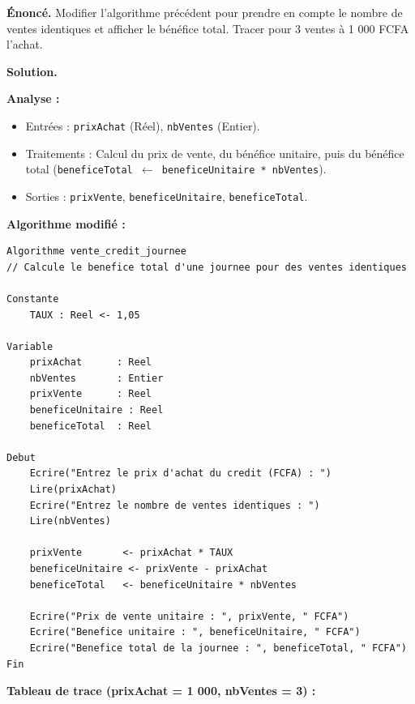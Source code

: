 \documentclass[11pt]{article}
\begin{document}
\begin{corrige}
\textbf{Énoncé.} Modifier l'algorithme précédent pour prendre en compte le nombre de ventes identiques et afficher le bénéfice total. Tracer pour 3 ventes à 1 000 FCFA l'achat.

\textbf{Solution.}

\textbf{Analyse :}
\begin{itemize}
\item Entrées : \texttt{prixAchat} (Réel), \texttt{nbVentes} (Entier).
\item Traitements : Calcul du prix de vente, du bénéfice unitaire, puis du bénéfice total (\texttt{beneficeTotal $\leftarrow$ beneficeUnitaire * nbVentes}).
\item Sorties : \texttt{prixVente}, \texttt{beneficeUnitaire}, \texttt{beneficeTotal}.
\end{itemize}

\textbf{Algorithme modifié :}

\begin{lstlisting}
Algorithme vente_credit_journee
// Calcule le benefice total d'une journee pour des ventes identiques

Constante
    TAUX : Reel <- 1,05

Variable
    prixAchat      : Reel
    nbVentes       : Entier
    prixVente      : Reel
    beneficeUnitaire : Reel
    beneficeTotal  : Reel

Debut
    Ecrire("Entrez le prix d'achat du credit (FCFA) : ")
    Lire(prixAchat)
    Ecrire("Entrez le nombre de ventes identiques : ")
    Lire(nbVentes)

    prixVente       <- prixAchat * TAUX
    beneficeUnitaire <- prixVente - prixAchat
    beneficeTotal   <- beneficeUnitaire * nbVentes

    Ecrire("Prix de vente unitaire : ", prixVente, " FCFA")
    Ecrire("Benefice unitaire : ", beneficeUnitaire, " FCFA")
    Ecrire("Benefice total de la journee : ", beneficeTotal, " FCFA")
Fin
\end{lstlisting}

\textbf{Tableau de trace (prixAchat = 1 000, nbVentes = 3) :}


\end{corrige}
\end{document}
